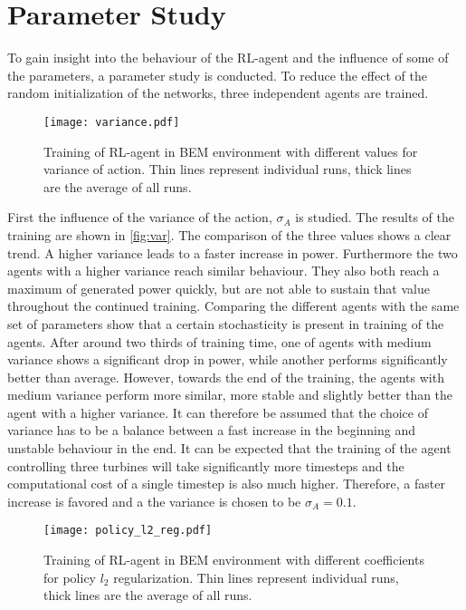 \section{Parameter Study}
To gain insight into the behaviour of the RL-agent and the influence of some of the parameters, a parameter study is conducted. To reduce the effect of the random initialization of the networks, three independent agents are trained. 
\begin{figure}[h]
	\centering
	\texttt{[image: variance.pdf]}
	\caption{Training of RL-agent in BEM environment with different values for variance of action. Thin lines represent individual runs, thick lines are the average of all runs.}
	\label{fig:var}
\end{figure}
First the influence of the variance of the action, $\sigma_A$ is studied. The results of the training are shown in \autoref{fig:var}. The comparison of the three values shows a clear trend. A higher variance leads to a faster increase in power. Furthermore the two agents with a higher variance reach similar behaviour. They also both reach a maximum of generated power quickly, but are not able to sustain that value throughout the continued training. Comparing the different agents with the same set of parameters show that a certain stochasticity is present in training of the agents.  After around two thirds of training time, one of agents with medium variance shows a significant drop in power, while another performs significantly better than average. However, towards the end of the training, the agents with medium variance perform more similar, more stable and slightly better than the agent with a higher variance. It can therefore be assumed that the choice of variance has to be a balance between a fast increase in the beginning and unstable behaviour in the end. It can be expected that the training of the agent controlling three turbines will take significantly more timesteps and the computational cost of a single timestep is also much higher. Therefore, a faster increase is favored and a the variance is chosen to be $\sigma_A = 0.1$. \\
\begin{figure}
	\centering
	\texttt{[image: policy\_l2\_reg.pdf]}
	\caption{Training of RL-agent in BEM environment with different coefficients for policy $l_2$ regularization. Thin lines represent individual runs, thick lines are the average of all runs.}
\end{figure}